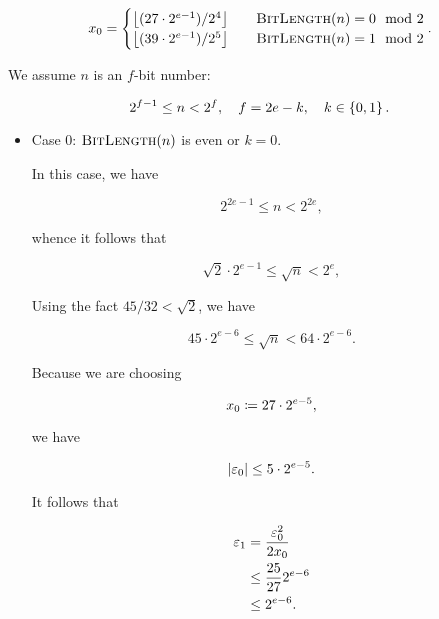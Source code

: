 \begin{equation}
    x_{0} = \begin{cases}
        \left\lfloor (27\cdot2^{e-1})/2^{4} \right\rfloor &\quad
            \textsc{BitLength}(n) = 0 \mod 2 \\
        \left\lfloor (39\cdot2^{e-1})/2^{5} \right\rfloor &\quad
            \textsc{BitLength}(n) = 1 \mod 2 \\
    \end{cases}.
\end{equation}

\noindent
We assume $n$ is an $f$-bit number:

\begin{equation}
    2^{f-1} \le n < 2^{f}, \quad f = 2e-k, \quad k\in\left\{ 0,1 \right\}.
\end{equation}

\begin{itemize}
\item Case 0: $\textsc{BitLength}(n)$ is even or $k=0$.

In this case, we have

\begin{equation}
    2^{2e-1} \le n < 2^{2e},
\end{equation}

\noindent
whence it follows that

\begin{equation}
    \sqrt{2}\cdot2^{e-1} \le \sqrt{n} < 2^{e},
\end{equation}

\noindent
Using the fact $45/32 < \sqrt{2}$, we have

\begin{equation}
    45\cdot2^{e-6} \le \sqrt{n} < 64\cdot2^{e-6}.
\end{equation}

\noindent
Because we are choosing

\begin{equation}
    x_{0} \coloneqq{} 27\cdot2^{e-5},
\end{equation}

\noindent
we have

\begin{equation}
    \left| \varepsilon_{0} \right| \le 5\cdot2^{e-5}.
\end{equation}

It follows that

\begin{align}
    \varepsilon_{1} &= \frac{\varepsilon_{0}^{2}}{2x_{0}} \nonumber\\
        &\le \frac{25}{27}2^{e-6} \nonumber\\
        &\le 2^{e-6}.
\end{align}


\end{itemize}
